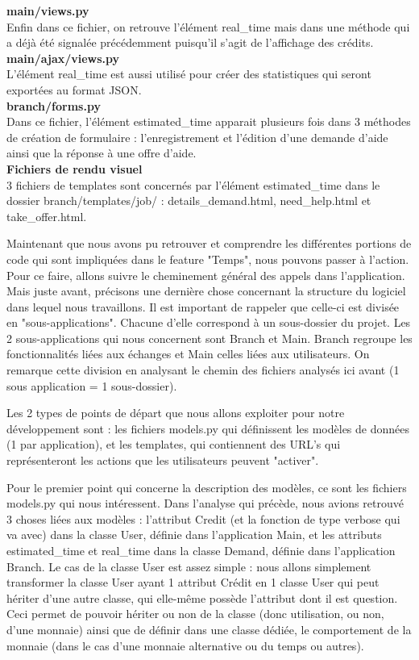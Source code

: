 \textbf{main/views.py}
\\%
Enfin dans ce fichier,  on retrouve l'élément real\_time mais dans une méthode qui a déjà été signalée précédemment puisqu'il s'agit de l'affichage des crédits.
\\
\textbf{main/ajax/views.py}
\\%
L'élément real\_time est aussi utilisé pour créer des statistiques qui seront exportées au format JSON.
\\
\textbf{branch/forms.py}
\\%
Dans ce fichier,   l'élément estimated\_time apparait plusieurs fois dans 3 méthodes de création de formulaire : l'enregistrement et l'édition d'une demande d'aide ainsi que la réponse à une offre d'aide.
\\
\textbf{Fichiers de rendu visuel}
\\%
3 fichiers de templates sont concernés par l'élément estimated\_time dans le dossier branch/templates/job/ : details\_demand.html,  need\_help.html et take\_offer.html.

Maintenant que nous avons pu retrouver et comprendre les différentes portions de code qui sont impliquées dans le feature "Temps",  nous pouvons passer à l'action.  Pour ce faire,  allons suivre le cheminement général des appels dans l'application.  Mais juste avant,  précisons une dernière chose concernant la structure du logiciel dans lequel nous travaillons.  Il est important de rappeler que celle-ci est divisée en "sous-applications".  Chacune d'elle correspond à un sous-dossier du projet.  Les 2 sous-applications qui nous concernent sont Branch et Main.  Branch regroupe les fonctionnalités liées aux échanges et Main celles liées aux utilisateurs.  On remarque cette division en analysant le chemin des fichiers analysés ici avant (1 sous application = 1 sous-dossier).  

Les 2 types de points de départ que nous allons exploiter pour notre développement sont : les fichiers models.py qui définissent les modèles de données (1 par application),  et les templates,  qui contiennent des URL's qui représenteront les actions que les utilisateurs peuvent "activer".  

Pour le premier point qui concerne la description des modèles,  ce sont les fichiers models.py qui nous intéressent.  Dans l'analyse qui précède,  nous avions retrouvé 3 choses liées aux modèles : l'attribut Credit (et la fonction de type verbose qui va avec) dans la classe User,  définie dans l'application Main,  et les attributs estimated\_time et real\_time dans la classe Demand,  définie dans l'application Branch.  Le cas de la classe User est assez simple : nous allons simplement transformer la classe User ayant 1 attribut Crédit en 1 classe User qui peut hériter d'une autre classe,  qui elle-même possède l'attribut dont il est question.  Ceci permet de pouvoir hériter ou non de la classe (donc utilisation,  ou non,  d'une monnaie) ainsi que de définir dans une classe dédiée,  le comportement de la monnaie (dans le cas d'une monnaie alternative ou du temps ou autres).  

